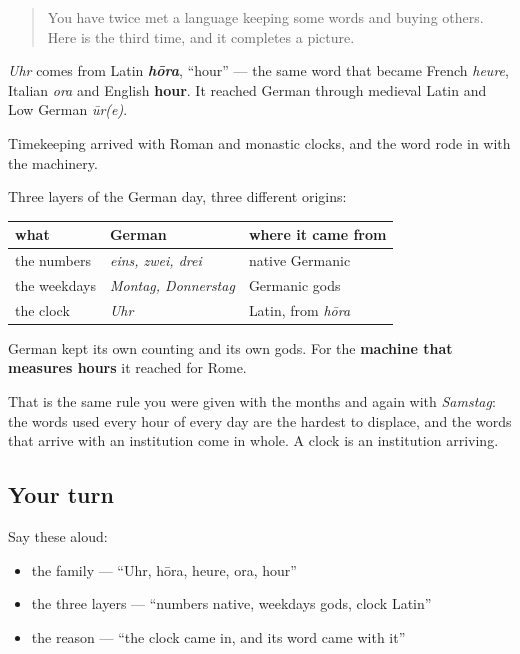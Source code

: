 \label{lesson:GE-C08-uhr-hora}



\begin{quote}
You have twice met a language keeping some words and buying others. Here is the third time, and it completes a picture.
\end{quote}

\begin{cousinweb}
\emph{Uhr} comes from Latin \emph{\textbf{hōra}}, \textquotedblleft{}hour\textquotedblright{} — the same word that became French \emph{heure}, Italian \emph{ora} and English \textbf{hour}. It reached German through medieval Latin and Low German \emph{ūr(e)}.

Timekeeping arrived with Roman and monastic clocks, and the word rode in with the machinery.
\end{cousinweb}

\begin{culture}
Three layers of the German day, three different origins:

\noindent
\begin{tabularx}{\linewidth}{@{}>{\raggedright\arraybackslash}X>{\raggedright\arraybackslash}X>{\raggedright\arraybackslash}X@{}}
\toprule
\textbf{what} & \textbf{German} & \textbf{where it came from} \\
\midrule
the numbers & \emph{eins, zwei, drei} & native Germanic \\
the weekdays & \emph{Montag, Donnerstag} & Germanic gods \\
the clock & \emph{Uhr} & Latin, from \emph{hōra} \\
\bottomrule
\end{tabularx}

German kept its own counting and its own gods. For the \textbf{machine that measures hours} it reached for Rome.

That is the same rule you were given with the months and again with \emph{Samstag}: the words used every hour of every day are the hardest to displace, and the words that arrive with an institution come in whole. A clock is an institution arriving.
\end{culture}

\subsection*{Your turn}
Say these aloud:

\begin{itemize}
\raggedright
  \item the family — \textquotedblleft{}Uhr, hōra, heure, ora, hour\textquotedblright{}
  \item the three layers — \textquotedblleft{}numbers native, weekdays gods, clock Latin\textquotedblright{}
  \item the reason — \textquotedblleft{}the clock came in, and its word came with it\textquotedblright{}
\end{itemize}


